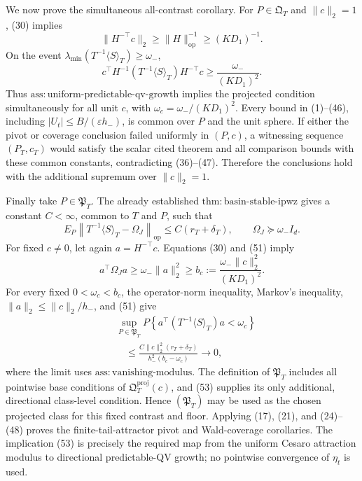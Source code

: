 We now prove the simultaneous all-contrast corollary. For \(P\in\mathfrak Q_T\) and \(\|c\|_2=1\), (30) implies
\[
 \|H^{-\top}c\|_2\ge\|H\|_{\mathrm{op}}^{-1}\ge(KD_1)^{-1}.
 \tag{49}
\]
On the event \(\lambda_{\min}(T^{-1}\langle S\rangle_T)\ge\omega_-\),
\[
 c^\top H^{-1}(T^{-1}\langle S\rangle_T)H^{-\top}c
 \ge\frac{\omega_-}{(KD_1)^2}.
 \tag{50}
\]
Thus \(\mathrm{ass:uniform\text{-}predictable\text{-}qv\text{-}growth}\) implies the projected condition simultaneously for all unit \(c\), with \(\omega_c=\omega_-/(KD_1)^2\). Every bound in (1)--(46), including \(|U_t|\le B/(\varepsilon h_-)\), is common over \(P\) and the unit sphere. If either the pivot or coverage conclusion failed uniformly in \((P,c)\), a witnessing sequence \((P_T,c_T)\) would satisfy the scalar cited theorem and all comparison bounds with these common constants, contradicting (36)--(47). Therefore the conclusions hold with the additional supremum over \(\|c\|_2=1\).

Finally take \(P\in\mathfrak P_T\). The already established \(\mathrm{thm:basin\text{-}stable\text{-}ipwz}\) gives a constant \(C<\infty\), common to \(T\) and \(P\), such that
\[
 E_P\left\|T^{-1}\langle S\rangle_T-\Omega_J\right\|_{\mathrm{op}}
 \le C(r_T+\delta_T),
 \qquad \Omega_J\succeq\omega_-I_d.
 \tag{51}
\]
For fixed \(c\ne0\), let again \(a=H^{-\top}c\). Equations (30) and (51) imply
\[
 a^\top\Omega_Ja
 \ge\omega_-\|a\|_2^2
 \ge b_c:=\frac{\omega_-\|c\|_2^2}{(KD_1)^2}.
 \tag{52}
\]
For every fixed \(0<\omega_c<b_c\), the operator-norm inequality, Markov's inequality, \(\|a\|_2\le\|c\|_2/h_-\), and (51) give
\[
 \begin{aligned}
 &\sup_{P\in\mathfrak P_T}
 P\!\left\{a^\top(T^{-1}\langle S\rangle_T)a<\omega_c\right\}\\
 &\quad\le
 \frac{C\|c\|_2^2(r_T+\delta_T)}
 {h_-^2(b_c-\omega_c)}\longrightarrow0,
 \end{aligned}
 \tag{53}
\]
where the limit uses \(\mathrm{ass:vanishing\text{-}modulus}\). The definition of \(\mathfrak P_T\) includes all pointwise base conditions of \(\mathfrak Q_T^{\mathrm{proj}}(c)\), and (53) supplies its only additional, directional class-level condition. Hence \((\mathfrak P_T)\) may be used as the chosen projected class for this fixed contrast and floor. Applying (17), (21), and (24)--(48) proves the finite-tail-attractor pivot and Wald-coverage corollaries. The implication (53) is precisely the required map from the uniform Cesaro attraction modulus to directional predictable-QV growth; no pointwise convergence of \(\eta_t\) is used.